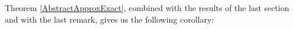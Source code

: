 \documentclass[a4paper,11pt]{article}
\theoremstyle{definition}
\numberwithin{equation}{section}
\newcommand{\K}{\mathcal{K}}
\begin{document}


\smallskip

Theorem \ref{AbstractApproxExact}, combined with the results of the last section and with the last remark, gives us the following corollary:
\end{document}
